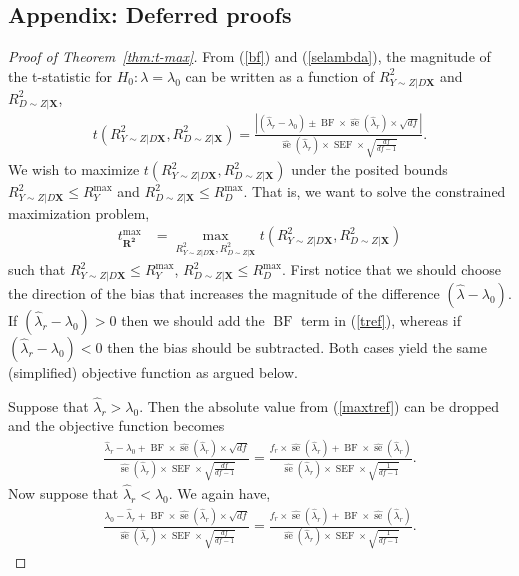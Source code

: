 \documentclass[sts]{imsart}
\theoremstyle{plain}
\theoremstyle{definition}
\newcommand{\df}{df}
\DeclareMathOperator{\se}{\text{se}}
\DeclareMathOperator{\SEF}{\text{SEF}}
\DeclareMathOperator{\BF}{\text{BF}}
\newcommand{\Ry}{R^2_{Y\sim Z | D\mathbf{X}}}
\newcommand{\Rd}{R^2_{D\sim Z | \mathbf{X}}}
\newcommand{\Rymax}{R^{\max }_{Y}}
\newcommand{\Rdmax}{R^{\max }_{D}}
\begin{document}
\begin{appendix}
\section*{Appendix: Deferred proofs}

\begin{proof}[Proof of Theorem~\ref{thm:t-max}]
    From (\ref{bf}) and (\ref{selambda}), the magnitude of the t-statistic for $H_0: \lambda = \lambda_0$ can be written as a function of $\Ry$ and $\Rd$,
    \begin{align}
        {\textstyle t(\Ry, \Rd)= 
        \frac{|(\hat{\lambda}_{r } - \lambda_0) \pm \BF \times \widehat{\se}(\hat{\lambda}_{r }) \times \sqrt{\df}|}{\widehat{\se}(\hat{\lambda}_{r })\times\SEF\times\sqrt{\frac{\df}{\df-1}}}.} \label{tref}
    \end{align}
    We wish to maximize $t(\Ry, \Rd)$  under the posited bounds $\Ry \leq \Rymax$ and  $\Rd \leq \Rdmax$. That is, we want to solve the constrained maximization problem,
    \begin{align}
        t_{\boldsymbol{R^2}}^{\max} &= \max_{\Ry, \Rd} t(\Ry, \Rd) \label{maxtref}
    \end{align}
    such that $\Ry \leq \Rymax$,  $\Rd \leq \Rdmax$. First notice that we should choose the direction of the bias that increases the magnitude of the difference $(\hat{\lambda} - \lambda_0)$. If $(\hat{\lambda}_{r } - \lambda_0) >0$ then we should add the $\BF$ term in (\ref{tref}), whereas if $(\hat{\lambda}_{r } - \lambda_0) < 0$ then the bias should be subtracted.
     Both cases yield the same (simplified) objective function as argued below.

    Suppose that $\hat{\lambda}_{r } > \lambda_0$. Then the absolute value from (\ref{maxtref}) can be dropped and the objective function becomes 
    \begin{align*}
       {\textstyle \frac{\hat{\lambda}_{r } - \lambda_0 + \BF \times \widehat{\se}(\hat{\lambda}_{r }) \times \sqrt{\df}}{\widehat{\se} (\hat{\lambda}_{r })\times\SEF\times\sqrt{\frac{\df}{\df-1}}}= 
        \frac{f_{r}  \times \widehat{\se}(\hat{\lambda}_{r }) + \BF \times \widehat{\se}(\hat{\lambda}_{r })}{\widehat{\se}(\hat{\lambda}_{r })\times\SEF\times\sqrt{\frac{1}{\df-1}}}. } 
    \end{align*}
    Now suppose that $\hat{\lambda}_{r } < \lambda_0$. We again have, 
    \begin{align*}
        {\textstyle  \frac{\lambda_0 - \hat{\lambda}_{r } + \BF \times \widehat{\se}(\hat{\lambda}_{r }) \times \sqrt{\df}}{\widehat{\se} (\hat{\lambda}_{r })\times\SEF\times\sqrt{\frac{\df}{\df-1}}} 
        = \frac{f_{r}  \times \widehat{\se}(\hat{\lambda}_{r }) + \BF \times \widehat{\se}(\hat{\lambda}_{r }) }{\widehat{\se}(\hat{\lambda}_{r })\times\SEF\times\sqrt{\frac{1}{\df-1}}}.}
    \end{align*}


\end{proof}
\end{appendix}
\end{document}
